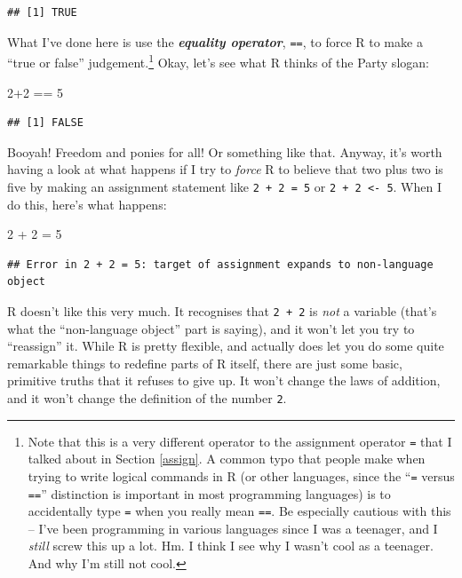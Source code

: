\documentclass[
]{book}
\newenvironment{Shaded}{\begin{snugshade}}{\end{snugshade}}
\newcommand{\DecValTok}[1]{\textcolor[rgb]{0.00,0.00,0.81}{#1}}
\newcommand{\OtherTok}[1]{\textcolor[rgb]{0.56,0.35,0.01}{#1}}
\newcommand{\SpecialCharTok}[1]{\textcolor[rgb]{0.00,0.00,0.00}{#1}}
\begin{document}
\begin{verbatim}
## [1] TRUE
\end{verbatim}

What I've done here is use the \textbf{\emph{equality operator}}, \texttt{==}, to force R to make a ``true or false'' judgement.\footnote{Note that this is a very different operator to the assignment operator \texttt{=} that I talked about in Section \ref{assign}. A common typo that people make when trying to write logical commands in R (or other languages, since the ``\texttt{=} versus \texttt{==}'' distinction is important in most programming languages) is to accidentally type \texttt{=} when you really mean \texttt{==}. Be especially cautious with this -- I've been programming in various languages since I was a teenager, and I \emph{still} screw this up a lot. Hm. I think I see why I wasn't cool as a teenager. And why I'm still not cool.} Okay, let's see what R thinks of the Party slogan:

\begin{Shaded}
\begin{Highlighting}[]
\DecValTok{2}\SpecialCharTok{+}\DecValTok{2} \SpecialCharTok{==} \DecValTok{5}
\end{Highlighting}
\end{Shaded}

\begin{verbatim}
## [1] FALSE
\end{verbatim}

Booyah! Freedom and ponies for all! Or something like that. Anyway, it's worth having a look at what happens if I try to \emph{force} R to believe that two plus two is five by making an assignment statement like \texttt{2\ +\ 2\ =\ 5} or \texttt{2\ +\ 2\ \textless{}-\ 5}. When I do this, here's what happens:

\begin{Shaded}
\begin{Highlighting}[]
\DecValTok{2} \SpecialCharTok{+} \DecValTok{2} \OtherTok{=} \DecValTok{5}
\end{Highlighting}
\end{Shaded}

\begin{verbatim}
## Error in 2 + 2 = 5: target of assignment expands to non-language object
\end{verbatim}

R doesn't like this very much. It recognises that \texttt{2\ +\ 2} is \emph{not} a variable (that's what the ``non-language object'' part is saying), and it won't let you try to ``reassign'' it. While R is pretty flexible, and actually does let you do some quite remarkable things to redefine parts of R itself, there are just some basic, primitive truths that it refuses to give up. It won't change the laws of addition, and it won't change the definition of the number \texttt{2}.
\end{document}

